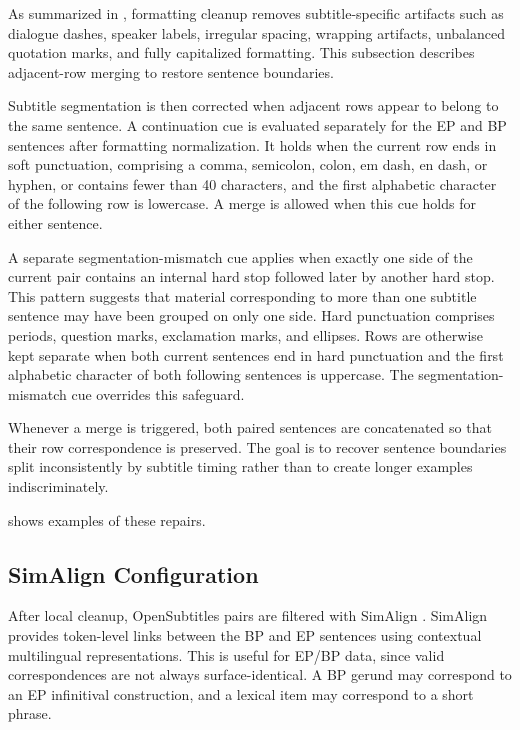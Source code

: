 As summarized in , formatting cleanup removes
subtitle-specific artifacts such as dialogue dashes, speaker labels, irregular
spacing, wrapping artifacts, unbalanced quotation marks, and fully capitalized
formatting. This subsection describes adjacent-row merging to restore sentence boundaries.

Subtitle segmentation is then corrected when adjacent rows appear to belong to
the same sentence. A continuation cue is evaluated separately for the EP and BP
sentences after formatting normalization. It holds when the current row ends in
soft punctuation, comprising a comma, semicolon, colon, em dash, en dash, or
hyphen, or contains fewer than 40 characters, and the first alphabetic character
of the following row is lowercase. A merge is allowed when this cue holds for
either sentence.

A separate segmentation-mismatch cue applies when exactly one side of the
current pair contains an internal hard stop followed later by another hard stop.
This pattern suggests that material corresponding to more than one subtitle
sentence may have been grouped on only one side. Hard punctuation comprises
periods, question marks, exclamation marks, and ellipses. Rows are otherwise
kept separate when both current sentences end in hard punctuation and the first
alphabetic character of both following sentences is uppercase. The
segmentation-mismatch cue overrides this safeguard.

Whenever a merge is triggered, both paired sentences are concatenated so that
their row correspondence is preserved. The goal is to recover sentence
boundaries split inconsistently by subtitle timing rather than to create longer
examples indiscriminately.

 shows
examples of these repairs.

\subsection{SimAlign Configuration}

After local cleanup, OpenSubtitles pairs are filtered with SimAlign
\citep{jalili-sabet-etal-2020-simalign}. SimAlign provides token-level links
between the BP and EP sentences using contextual multilingual representations.
This is useful for EP/BP data, since valid correspondences are not always
surface-identical. A BP gerund may correspond to an EP infinitival
construction, and a lexical item may correspond to a short phrase.

